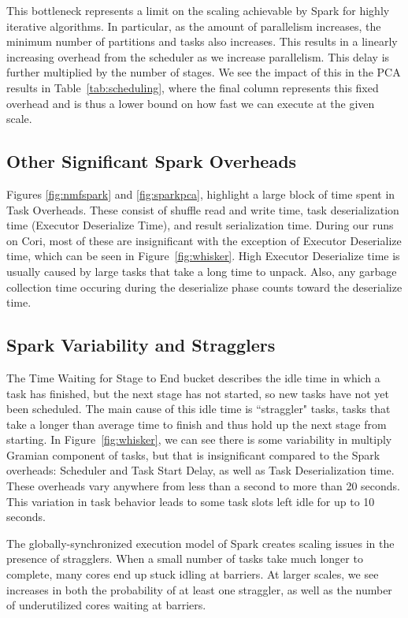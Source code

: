 This bottleneck represents a limit on the scaling achievable by Spark for highly iterative algorithms.  In particular, as the amount of parallelism increases, the minimum number of partitions and tasks also increases.  This results in a linearly increasing overhead from the scheduler as we increase parallelism.  This delay is further multiplied by the number of stages.  We see the impact of this in the PCA results in Table~\ref{tab:scheduling}, where the final column represents this fixed overhead and is thus a lower bound on how fast we can execute at the given scale.  
\subsection{Other Significant Spark Overheads}
Figures \ref{fig:nmfspark} and \ref{fig:sparkpca}, highlight a large block of time spent in Task Overheads. These consist of  shuffle read and write time, task deserialization time (Executor Deserialize Time), and result serialization time.  During our runs on Cori, most of these are insignificant with the exception of Executor Deserialize time, which can be seen in  Figure~\ref{fig:whisker}.  High Executor Deserialize time is usually caused by large tasks that take a long time to unpack. Also, any garbage collection time occuring during the deserialize phase counts toward the deserialize time.
\subsection{Spark Variability and Stragglers}
The Time Waiting for Stage to End bucket describes the idle time in which a task has finished, but the next stage has not started, so new tasks have not yet been scheduled. The main cause of this idle time is ``straggler" tasks, tasks that take a longer than average time to finish and thus hold up the next stage from starting. In Figure~\ref{fig:whisker}, we can see there is some variability in multiply Gramian component of tasks, but that is insignificant compared to the Spark overheads: Scheduler and Task Start Delay, as well as Task Deserialization time. These overheads vary anywhere from less than a second to more than 20 seconds. This variation in task behavior leads to some task slots left idle for up to 10 seconds.

The globally-synchronized execution model of Spark creates scaling issues in the presence of stragglers. When a small number of tasks take much longer to complete, many cores end up stuck idling at barriers. At larger scales, we see increases in both the probability of at least one straggler, as well as the number of underutilized cores waiting at barriers.


